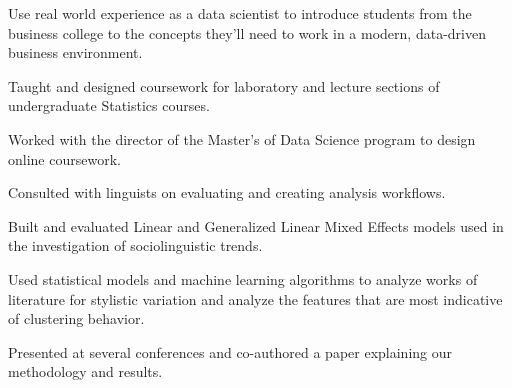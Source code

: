 \documentclass[letterpaper]{deedy-resume} %
\begin{document}
\begin{minipage}[t]{0.63\textwidth}
\vspace{\topsep} %
\begin{tightitemize}
\item Use real world experience as a data scientist to introduce
  students from the business college to the concepts they'll need to
  work in a modern, data-driven  business environment.
\end{tightitemize}
\sectionspace %



\begin{tightitemize}
\item Taught and designed coursework for laboratory and
  lecture sections of undergraduate Statistics courses.
\item Worked with the director of the Master's of Data Science program
  to design online coursework.
\end{tightitemize}

\sectionspace %


\begin{tightitemize}
\item Consulted with linguists on evaluating and creating analysis workflows.
\item Built and evaluated Linear and Generalized Linear Mixed Effects
  models used in the investigation of sociolinguistic trends.
\end{tightitemize}

\sectionspace %


\begin{tightitemize}
\item Used statistical models and machine learning algorithms to analyze
  works of literature for stylistic variation and analyze the features
  that are most indicative of clustering behavior.
\item Presented at several conferences and co-authored a paper
  explaining our methodology and results.
\end{tightitemize}


\end{minipage}
\end{document}
